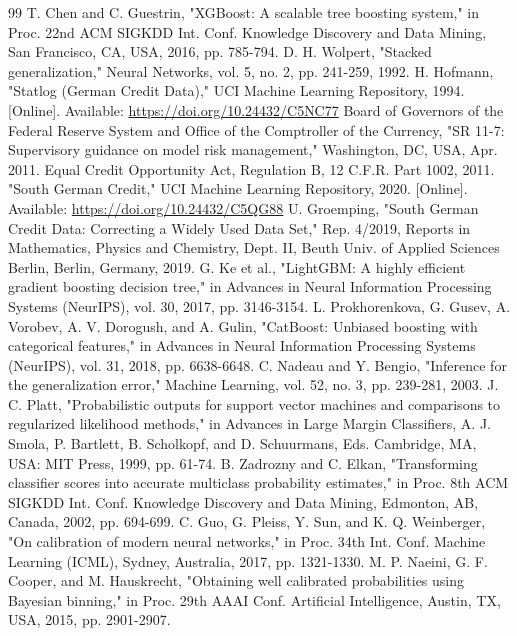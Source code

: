 \begin{thebibliography}{99}
 T. Chen and C. Guestrin, "XGBoost: A scalable tree boosting system," in Proc. 22nd ACM SIGKDD Int. Conf. Knowledge Discovery and Data Mining, San Francisco, CA, USA, 2016, pp. 785-794.
 D. H. Wolpert, "Stacked generalization," Neural Networks, vol. 5, no. 2, pp. 241-259, 1992.
 H. Hofmann, "Statlog (German Credit Data)," UCI Machine Learning Repository, 1994. [Online]. Available: \url{https://doi.org/10.24432/C5NC77}
 Board of Governors of the Federal Reserve System and Office of the Comptroller of the Currency, "SR 11-7: Supervisory guidance on model risk management," Washington, DC, USA, Apr. 2011.
 Equal Credit Opportunity Act, Regulation B, 12 C.F.R. Part 1002, 2011.
 "South German Credit," UCI Machine Learning Repository, 2020. [Online]. Available: \url{https://doi.org/10.24432/C5QG88}
 U. Groemping, "South German Credit Data: Correcting a Widely Used Data Set," Rep. 4/2019, Reports in Mathematics, Physics and Chemistry, Dept. II, Beuth Univ. of Applied Sciences Berlin, Berlin, Germany, 2019.
 G. Ke et al., "LightGBM: A highly efficient gradient boosting decision tree," in Advances in Neural Information Processing Systems (NeurIPS), vol. 30, 2017, pp. 3146-3154.
 L. Prokhorenkova, G. Gusev, A. Vorobev, A. V. Dorogush, and A. Gulin, "CatBoost: Unbiased boosting with categorical features," in Advances in Neural Information Processing Systems (NeurIPS), vol. 31, 2018, pp. 6638-6648.
 C. Nadeau and Y. Bengio, "Inference for the generalization error," Machine Learning, vol. 52, no. 3, pp. 239-281, 2003.
 J. C. Platt, "Probabilistic outputs for support vector machines and comparisons to regularized likelihood methods," in Advances in Large Margin Classifiers, A. J. Smola, P. Bartlett, B. Scholkopf, and D. Schuurmans, Eds. Cambridge, MA, USA: MIT Press, 1999, pp. 61-74.
 B. Zadrozny and C. Elkan, "Transforming classifier scores into accurate multiclass probability estimates," in Proc. 8th ACM SIGKDD Int. Conf. Knowledge Discovery and Data Mining, Edmonton, AB, Canada, 2002, pp. 694-699.
 C. Guo, G. Pleiss, Y. Sun, and K. Q. Weinberger, "On calibration of modern neural networks," in Proc. 34th Int. Conf. Machine Learning (ICML), Sydney, Australia, 2017, pp. 1321-1330.
 M. P. Naeini, G. F. Cooper, and M. Hauskrecht, "Obtaining well calibrated probabilities using Bayesian binning," in Proc. 29th AAAI Conf. Artificial Intelligence, Austin, TX, USA, 2015, pp. 2901-2907.

\end{thebibliography}
